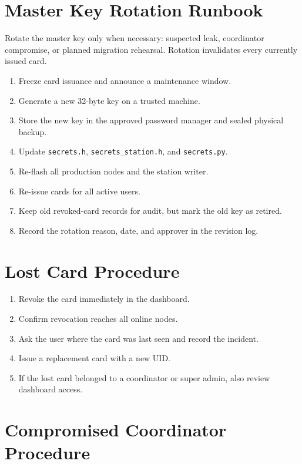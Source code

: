 \section{Master Key Rotation Runbook}
\label{sec:master_key_rotation}

Rotate the master key only when necessary: suspected leak, coordinator compromise, or planned migration rehearsal. Rotation invalidates every currently issued card.

\begin{enumerate}[leftmargin=1.5em]
    \item Freeze card issuance and announce a maintenance window.
    \item Generate a new 32-byte key on a trusted machine.
    \item Store the new key in the approved password manager and sealed physical backup.
    \item Update \texttt{secrets.h}, \texttt{secrets\_station.h}, and \texttt{secrets.py}.
    \item Re-flash all production nodes and the station writer.
    \item Re-issue cards for all active users.
    \item Keep old revoked-card records for audit, but mark the old key as retired.
    \item Record the rotation reason, date, and approver in the revision log.
\end{enumerate}

\section{Lost Card Procedure}

\begin{enumerate}[leftmargin=1.5em]
    \item Revoke the card immediately in the dashboard.
    \item Confirm revocation reaches all online nodes.
    \item Ask the user where the card was last seen and record the incident.
    \item Issue a replacement card with a new UID.
    \item If the lost card belonged to a coordinator or super admin, also review dashboard access.
\end{enumerate}

\section{Compromised Coordinator Procedure}

